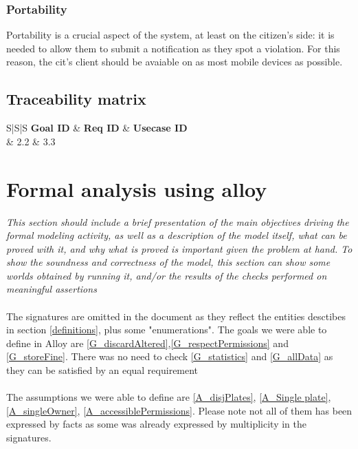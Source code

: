 \documentclass{article}
\begin{document}
		\subsubsection{Portability}
			Portability is a crucial aspect of the system, at least on the citizen's side: it is needed to allow them to submit a notification as they spot a violation. For this reason, the cit's client should be avaiable on as most mobile devices as possible.
	\subsection{Traceability matrix}
		\begin{table}[h]
			\begin{center}
				\caption{Traceability matrix}
				\label{Trace matrix}
				\begin{tabular}{S|S|S}
					\textbf{Goal ID} & \textbf{Req ID} & \textbf{Usecase ID}\\
					 & 2.2 & 3.3
				\end{tabular}
			\end{center}
		\end{table}
\section{Formal analysis using alloy} \textit{This section should include a brief presentation of the main objectives driving the formal modeling activity, as well as a description of the model itself, what can be proved with it, and why what is proved is important given the problem at hand. To show the soundness and correctness of the model, this section can show some worlds obtained by running it, and/or the results of the checks performed on meaningful assertions}
	\paragraph{}The signatures are omitted in the document as they reflect the entities 				desctibes in section \ref{definitions}, plus some "enumerations". The goals we were able to define in Alloy are \ref{G_discardAltered},\ref{G_respectPermissions} and \ref{G_storeFine}.
	There was no need to check \ref{G_statistics} and \ref{G_allData} as they can be satisfied 	by an equal requirement
	\paragraph{}The assumptions we were able to define are \ref{A_disjPlates}, \ref{A_Single plate}, \ref{A_singleOwner}, \ref{A_accessiblePermissions}. Please note not all of them has been expressed by facts as some was already expressed by multiplicity in the signatures.
\end{document}
